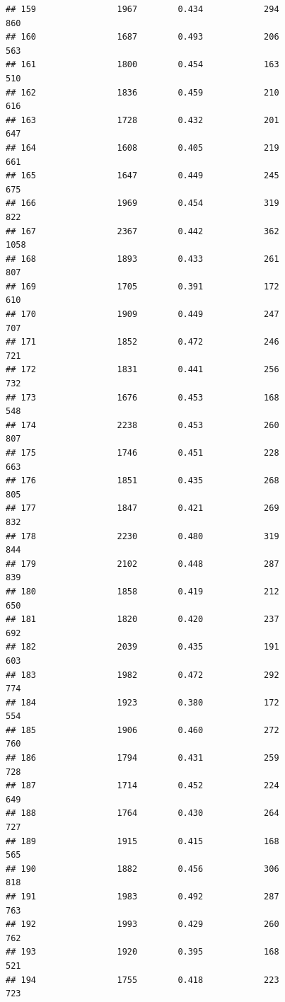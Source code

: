 \documentclass[]{book}
\begin{document}
\begin{verbatim}
## 159                1967        0.434            294                860
## 160                1687        0.493            206                563
## 161                1800        0.454            163                510
## 162                1836        0.459            210                616
## 163                1728        0.432            201                647
## 164                1608        0.405            219                661
## 165                1647        0.449            245                675
## 166                1969        0.454            319                822
## 167                2367        0.442            362               1058
## 168                1893        0.433            261                807
## 169                1705        0.391            172                610
## 170                1909        0.449            247                707
## 171                1852        0.472            246                721
## 172                1831        0.441            256                732
## 173                1676        0.453            168                548
## 174                2238        0.453            260                807
## 175                1746        0.451            228                663
## 176                1851        0.435            268                805
## 177                1847        0.421            269                832
## 178                2230        0.480            319                844
## 179                2102        0.448            287                839
## 180                1858        0.419            212                650
## 181                1820        0.420            237                692
## 182                2039        0.435            191                603
## 183                1982        0.472            292                774
## 184                1923        0.380            172                554
## 185                1906        0.460            272                760
## 186                1794        0.431            259                728
## 187                1714        0.452            224                649
## 188                1764        0.430            264                727
## 189                1915        0.415            168                565
## 190                1882        0.456            306                818
## 191                1983        0.492            287                763
## 192                1993        0.429            260                762
## 193                1920        0.395            168                521
## 194                1755        0.418            223                723

\end{verbatim}
\end{document}
